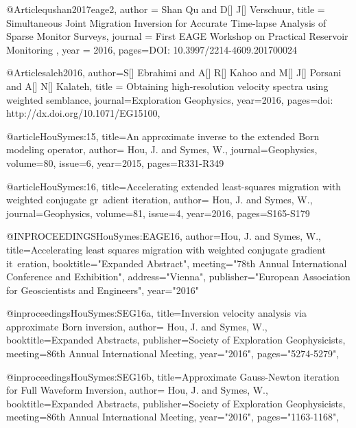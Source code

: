 @Article{qushan2017eage2,
  author = 	 {Shan Qu and D[] J[] Verschuur},
  title = 	 {Simultaneous Joint Migration Inversion for Accurate Time-lapse Analysis of Sparse Monitor Surveys},
  journal = 	 { First EAGE Workshop on Practical Reservoir Monitoring },
  year = 	 2016,
  pages={DOI: 10.3997/2214-4609.201700024}}
  
  

@Article{saleh2016,
  author={S[] Ebrahimi and A[] R[] Kahoo and M[] J[] Porsani and A[] N[] Kalateh},
  title = {Obtaining high-resolution velocity spectra using weighted semblance},
  journal={Exploration Geophysics},
  year=2016,
  pages={doi: http://dx.doi.org/10.1071/EG15100},
}

@article{HouSymes:15,
title={An approximate inverse to the extended {B}orn modeling operator},
author= {Hou, J. and Symes, W.},
journal={Geophysics},
volume={80},
issue={6},
year={2015},
pages={R331-R349}
}

@article{HouSymes:16,
title={Accelerating extended least-squares migration with weighted conjugate gr\
adient iteration},
author= {Hou, J. and Symes, W.},
journal={Geophysics},
volume={81},
issue={4},
year={2016},
pages={S165-S179}
}

@INPROCEEDINGS{HouSymes:EAGE16,
author={Hou, J. and Symes, W.},
title={Accelerating least squares migration with weighted conjugate gradient it\
eration},
booktitle="Expanded Abstract",
meeting="78th Annual International Conference and Exhibition",
address="Vienna",
publisher="European Association for Geoscientists and Engineers",
year="2016"}

@inproceedings{HouSymes:SEG16a,
title={Inversion velocity analysis via approximate Born inversion},
author= {Hou, J. and Symes, W.},
booktitle={Expanded Abstracts},
publisher={Society of Exploration Geophysicists},
meeting={86th Annual International Meeting},
year="2016",
pages="5274-5279",
}

@inproceedings{HouSymes:SEG16b,
title={Approximate Gauss-Newton iteration for Full Waveform Inversion},
author= {Hou, J. and Symes, W.},
booktitle={Expanded Abstracts},
publisher={Society of Exploration Geophysicists},
meeting={86th Annual International Meeting},
year="2016",
pages="1163-1168",
}

